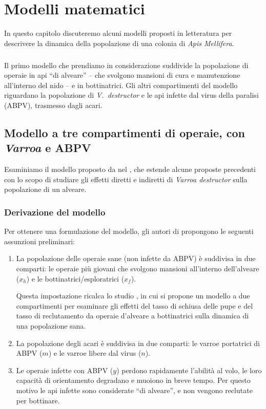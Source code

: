 \chapter[Modelli]{Modelli matematici}
In questo capitolo discuteremo alcuni modelli proposti in letteratura per descrivere la dinamica della popolazione di una colonia di \emph{Apis Mellifera}.

\paragraph{}
Il primo modello che prendiamo in considerazione \parencite{ratti2017} suddivide la popolazione di operaie in api ``di alveare'' -- che svolgono mansioni di cura e manutenzione all'interno del nido -- e in bottinatrici.
Gli altri compartimenti del modello riguardano la popolazione di \emph{V.~destructor} e le api infette dal virus della paralisi (ABPV), trasmesso dagli acari.

\section{Modello a tre compartimenti di operaie, con \emph{Varroa} e ABPV}
Esaminiamo il modello proposto da \citeauthor{ratti2017} nel \citeyear{ratti2017}, che estende alcune proposte precedenti con lo scopo di studiare gli effetti diretti e indiretti di \emph{Varroa destructor} sulla popolazione di un alveare.

\subsection{Derivazione del modello}
Per ottenere una formulazione del modello, gli autori di \cite{ratti2017} propongono le seguenti assunzioni preliminari:
\begin{enumerate}
    \item La popolazione delle operaie sane (non infette da ABPV) è suddivisa in due comparti: le operaie più giovani che svolgono mansioni all'interno dell'alveare ($x_h$) e le bottinatrici/esploratrici ($x_f$).

    Questa impostazione ricalca lo studio \cite{khoury2011}, in cui si propone un modello a due compartimenti per esaminare gli effetti del tasso di schiusa delle pupe e del tasso di reclutamento da operaie d'alveare a bottinatrici sulla dinamica di una popolazione sana.
    \item La popolazione degli acari è suddivisa in due comparti: le varroe portatrici di ABPV ($m$) e le varroe libere dal virus ($n$).
    \item Le operaie infette con ABPV ($y$) perdono rapidamente l'abilità al volo, le loro capacità di orientamento degradano e muoiono in breve tempo. Per questo motivo le api infette sono considerate ``di alveare'', e non vengono reclutate per bottinare.
\end{enumerate}

